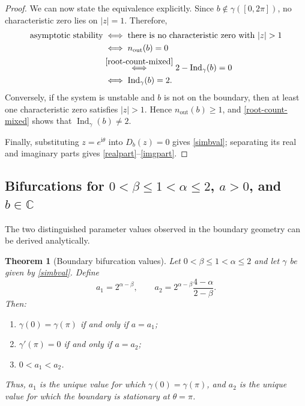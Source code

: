\documentclass[11pt,a4paper]{article}
\newtheorem{thm}{Theorem}[section]
\theoremstyle{definition}
\begin{document}
\begin{proof}
We can now state the equivalence explicitly. Since $b\notin\gamma([0,2\pi])$, no characteristic zero lies on $|z|=1$. Therefore,
\begin{align*}
\text{asymptotic stability}
&\iff \text{there is no characteristic zero with }|z|>1\\
&\iff n_{\mathrm{out}}(b)=0\\
&\overset{\eqref{root-count-mixed}}{\iff}
2-\operatorname{Ind}_{\gamma}(b)=0\\
&\iff \operatorname{Ind}_{\gamma}(b)=2.
\end{align*}
Conversely, if the system is unstable and $b$ is not on the boundary, then at least one characteristic zero satisfies $|z|>1$. Hence $n_{\mathrm{out}}(b)\geq1$, and \eqref{root-count-mixed} shows that $\operatorname{Ind}_{\gamma}(b)\neq2$.

Finally, substituting $z=e^{\mathrm{i}\theta}$ into $D_b(z)=0$ gives \eqref{simbval}; separating its real and imaginary parts gives \eqref{realpart}--\eqref{imgpart}.
\end{proof}
\subsection[Bifurcations for complex parameter b]{Bifurcations for $0 < \beta \leq 1 < \alpha \leq 2$, $a > 0$, and $b \in \mathbb{C}$} \label{imaginary case}
The two distinguished parameter values observed in the boundary geometry can be derived analytically.

\begin{thm}[Boundary bifurcation values]\label{thm:bifurcation-values}
Let $0 < \beta \leq 1 < \alpha \leq 2$ and let $\gamma$ be given by \eqref{simbval}. Define
\begin{equation}\label{a1a2}
a_1=2^{\alpha-\beta},
\qquad
a_2=2^{\alpha-\beta}\frac{4-\alpha}{2-\beta}.
\end{equation}
Then:
\begin{enumerate}
\item $\gamma(0)=\gamma(\pi)$ if and only if $a=a_1$;
\item $\gamma'(\pi)=0$ if and only if $a=a_2$;
\item $0<a_1<a_2$.
\end{enumerate}
Thus, $a_1$ is the unique value for which $\gamma(0)=\gamma(\pi)$, and $a_2$ is the unique value for which the boundary is stationary at $\theta=\pi$.
\end{thm}
\end{document}
